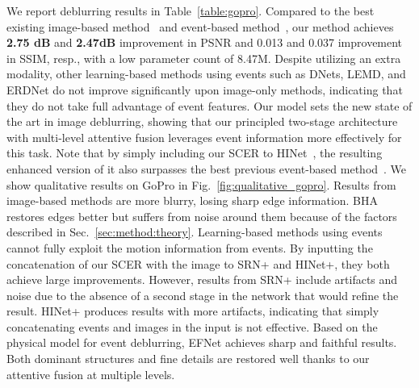 \documentclass[runningheads]{llncs}
\newcommand{\PAR}[1]{\noindent{\bf #1}}
\newlength \g
\begin{document}
\PAR{GoPro dataset.}
We report deblurring results in Table~\ref{table:gopro}. Compared to the best existing image-based method~\cite{chen2021hinet} and event-based method~\cite{haoyu2020learning}, our method achieves \textbf{2.75 dB} and \textbf{2.47dB} improvement in PSNR and 0.013 and 0.037 improvement in SSIM, resp., with a low parameter count of 8.47M. Despite utilizing an extra modality, other learning-based methods using events such as DNets, LEMD, and ERDNet do not improve significantly upon image-only methods, indicating that they do not take full advantage of event features. Our model sets the new state of the art in image deblurring, showing that our principled two-stage architecture with multi-level attentive fusion leverages event information more effectively for this task. Note that by simply including our SCER to HINet~\cite{chen2021hinet}, the resulting enhanced version of it also surpasses the best previous event-based method~\cite{haoyu2020learning}. We show qualitative results on GoPro in Fig.~\ref{fig:qualitative_gopro}. Results from image-based methods are more blurry, losing sharp edge information. BHA~\cite{pan2019bringing_high_framerate} restores edges better but suffers from noise around them because of the factors described in Sec.~\ref{sec:method:theory}. Learning-based methods using events cannot fully exploit the motion information from events. By inputting the concatenation of our SCER with the image to SRN+ and HINet+, they both achieve large improvements. However, results from SRN+ include artifacts and noise due to the absence of a second stage in the network that would refine the result. HINet+ produces results with more artifacts, indicating that simply concatenating events and images in the input is not effective. Based on the physical model for event deblurring, EFNet achieves sharp and faithful results. Both dominant structures and fine details are restored well thanks to our attentive fusion at multiple levels.
\end{document}
